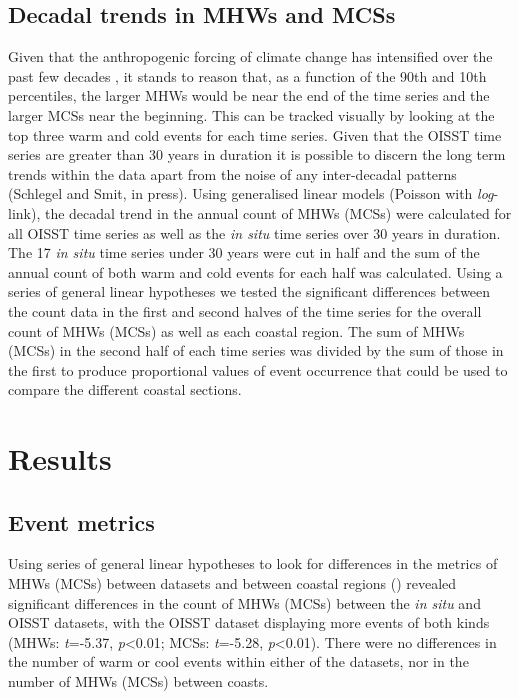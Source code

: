 \documentclass[a4paper,10pt,review]{elsarticle}
\begin{document}
\subsection{Decadal trends in MHWs and MCSs}
Given that the anthropogenic forcing of climate change has intensified over the past few decades \citep{IPCC2014}, it stands to reason that, as a function of the 90th and 10th percentiles, the larger MHWs would be near the end of the time series and the larger MCSs near the beginning. This can be tracked visually by looking at the top three warm and cold events for each time series. Given that the OISST time series are greater than 30 years in duration it is possible to discern the long term trends within the data apart from the noise of any inter-decadal patterns (Schlegel and Smit, in press). Using generalised linear models (Poisson with \emph{log}-link), the decadal trend in the annual count of MHWs (MCSs) were calculated for all OISST time series as well as the \emph{in situ} time series over 30 years in duration. The 17 \emph{in situ} time series under 30 years were cut in half and the sum of the annual count of both warm and cold events for each half was calculated. Using a series of general linear hypotheses \citep{Hothorn2008} we tested the significant differences between the count data in the first and second halves of the time series for the overall count of MHWs (MCSs) as well as each coastal region. The sum of MHWs (MCSs) in the second half of each time series was divided by the sum of those in the first to produce proportional values of event occurrence that could be used to compare the different coastal sections.

\section{Results}

\subsection{Event metrics}
Using series of general linear hypotheses \citep{Hothorn2008} to look for differences in the metrics of MHWs (MCSs) between datasets and between coastal regions () revealed significant differences in the count of MHWs (MCSs) between the \emph{in situ} and OISST datasets, with the OISST dataset displaying more events of both kinds (MHWs: \emph{t}=-5.37, \emph{p}<0.01; MCSs: \emph{t}=-5.28, \emph{p}<0.01). There were no differences in the number of warm or cool events within either of the datasets, nor in the number of MHWs (MCSs) between coasts.
\end{document}
